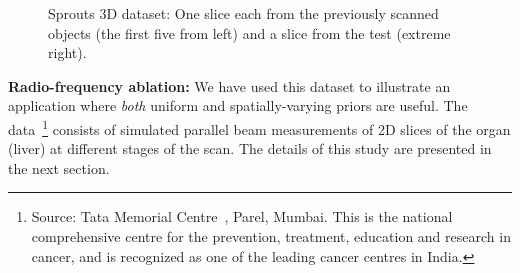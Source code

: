 \documentclass[journal]{IEEEtran}
\begin{document}
\begin{figure}[!h]
\begin{subfigure}[b]{0.29\linewidth}
\captionsetup{labelformat=empty}
        \caption{}
     \end{subfigure}
      \caption{Sprouts 3D dataset: One slice each from the previously scanned objects (the first five from left) and a slice from the test (extreme
        right).}
\label{fig:object-prior_test_sprouts}
\addtolength{\textfloatsep}{-0.8cm}
\end{figure}

\textbf{Radio-frequency ablation:} We have used this dataset to
illustrate an application where \textit{both} uniform and spatially-varying priors are
useful. The data~\footnote{Source: Tata Memorial
  Centre~\cite{tmh}, Parel, Mumbai.  This is the national
  comprehensive centre for the prevention, treatment, education and
  research in cancer, and is recognized as one of the leading cancer
  centres in India.} consists of simulated parallel beam measurements of 2D slices
of the organ (liver) at different stages of the scan. The details of this study are presented in the next section.
\end{document}
